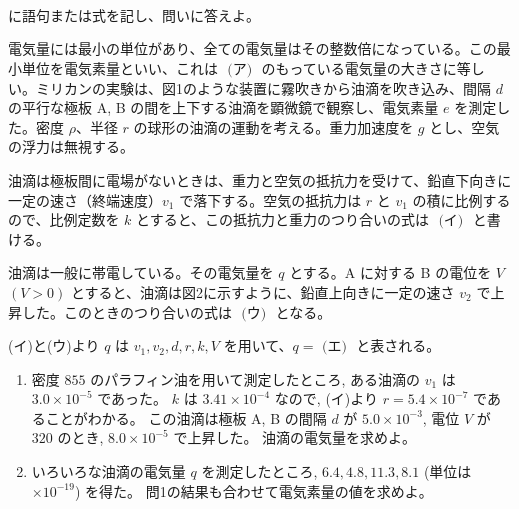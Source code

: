 \hakosyokika
\item
    \begin{mawarikomi}{180pt}{
        
        \\
        \\
        \hfill~~\hfill~
    }
\karaHako に語句または式を記し、問いに答えよ。

電気量には最小の単位があり、全ての電気量はその整数倍になっている。この最小単位を電気素量といい、これは $\boxed{\text{ (ア) }}$ のもっている電気量の大きさに等しい。ミリカンの実験は、図1のような装置に霧吹きから油滴を吹き込み、間隔 $d$ の平行な極板 A, B の間を上下する油滴を顕微鏡で観察し、電気素量 $e$ を測定した。密度 $\rho $、半径 $r$ の球形の油滴の運動を考える。重力加速度を $g$ とし、空気の浮力は無視する。

油滴は極板間に電場がないときは、重力と空気の抵抗力を受けて、鉛直下向きに一定の速さ（終端速度）$v_1$ で落下する。空気の抵抗力は $r$ と $v_1$ の積に比例するので、比例定数を $k$ とすると、この抵抗力と重力のつり合いの式は $\boxed{\text{ (イ) }}$ と書ける。

油滴は一般に帯電している。その電気量を $q$ とする。A に対する B の電位を $V$$(V>0)$ とすると、油滴は図2に示すように、鉛直上向きに一定の速さ $v_2$ で上昇した。このときのつり合いの式は $\boxed{\text{ (ウ) }}$ となる。

(イ)と(ウ)より $q$ は $v_1, v_2, d, r, k, V$ を用いて、$q=\boxed{\text{ (エ) }}$ と表される。

    \begin{enumerate}[問1]
    \item 密度 $855$  のパラフィン油を用いて測定したところ, ある油滴の $v_1$ は $3.0 \times 10^{-5} $ であった。 $k$ は $3.41 \times 10^{-4} $ なので, (イ)より $r=5.4 \times 10^{-7} $ であることがわかる。 この油滴は極板 A, B の間隔 $d$ が $5.0 \times 10^{-3} $, 電位 $V$ が $320 $ のとき, $8.0 \times 10^{-5} $ で上昇した。 油滴の電気量を求めよ。
    \item いろいろな油滴の電気量 $q $ を測定したところ, $6.4, 4.8, 11.3, 8.1$ (単位は$\times 10^{-19} $) を得た。 問1の結果も合わせて電気素量の値を求めよ。
    \end{enumerate}
\end{mawarikomi}

